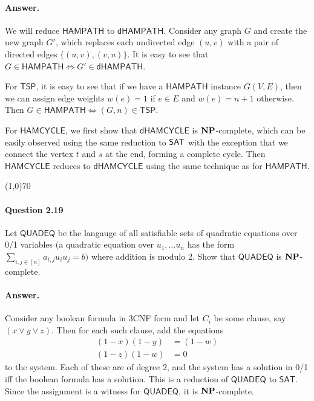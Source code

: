 \paragraph{Answer.} We will reduce $\mathsf{HAMPATH}$ to $\mathsf{dHAMPATH}$. Consider any graph $G$ and create the new graph $G'$, which replaces each undirected edge $(u,v)$ with a pair of directed edges $\{(u,v),(v,u)\}$. It is easy to see that $G\in\mathsf{HAMPATH}\iff G'\in\mathsf{dHAMPATH}$.

For $\mathsf{TSP}$, it is easy to see that if we have a $\mathsf{HAMPATH}$ instance $G(V,E)$, then we can assign edge weights $w(e)=1$ if $e\in E$ and $w(e)=n+1$ otherwise. Then $G\in\mathsf{HAMPATH}\iff (G,n)\in\mathsf{TSP}$.

For $\mathsf{HAMCYCLE}$, we first show that $\mathsf{dHAMCYCLE}$ is $\mathbf{NP}$-complete, which can be easily observed using the same reduction to $\mathsf{SAT}$ with the exception that we connect the vertex $t$ and $s$ at the end, forming a complete cycle. Then $\mathsf{HAMCYCLE}$ reduces to $\mathsf{dHAMCYCLE}$ using the same technique as for $\mathsf{HAMPATH}$.
 
\begin{center}
	\line(1,0){70}
\end{center}

\paragraph{Question 2.19} Let $\mathsf{QUADEQ}$ be the langauge of all satisfiable sets of quadratic equations over 0/1 variables (a quadratic equation over $u_1,\dots u_n$ has the form $\sum_{i,j\in[n]}a_{i,j}u_iu_j=b)$ where addition is modulo 2. Show that $\mathsf{QUADEQ}$ is $\mathbf{NP}$-complete.

\paragraph{Answer.} Consider any boolean formula in 3CNF form and let $C_i$ be some clause, say $(x\vee y\vee z)$. Then for each such clause, add the equations
\begin{align*}
	(1-x)(1-y)&=(1-w)\\
	(1-z)(1-w)&=0
\end{align*}
to the system. Each of these are of degree $2$, and the system has a solution in 0/1 iff the boolean formula has a solution. This is a reduction of $\mathsf{QUADEQ}$ to $\mathsf{SAT}$. Since the assignment is a witness for $\mathsf{QUADEQ}$, it is $\mathbf{NP}$-complete.

